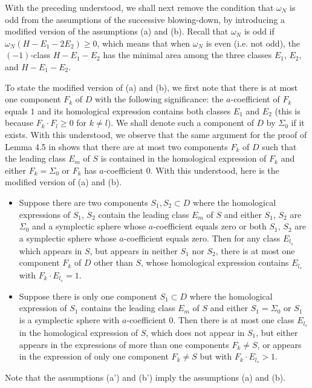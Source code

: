 \documentclass[11pt]{amsart}
\theoremstyle{plain}
\numberwithin{theorem}{section}
\theoremstyle{definition}
\begin{document}
With the preceding understood, we shall next remove the condition that $\omega_N$ is odd from
the assumptions of the successive blowing-down, by introducing a modified version of the assumptions (a) and (b). Recall that $\omega_N$ is odd if $\omega_N(H-E_1-2E_2)\geq 0$,
which means that when $\omega_N$ is even (i.e. not odd), the $(-1)$-class $H-E_1-E_2$
has the minimal area among the three classes $E_1$, $E_2$, and $H-E_1-E_2$. 

To state the modified version of (a) and (b), we first note that there is at most one component 
$F_k$ of $D$ with the following significance: the $a$-coefficient of $F_k$ equals $1$ and its homological expression contains both classes $E_1$ and $E_2$ (this is because $F_k\cdot F_l\geq 0$ for $k\neq l$). We shall denote such a component of $D$ by $\Sigma_0$ if it exists. With this understood, we observe that the same argument for the proof of Lemma 4.5 in \cite{C1} shows that there are at most two components $F_k$ of $D$ such that the leading class $E_m$ of $S$ is contained in the homological expression of $F_k$ and either $F_k=\Sigma_0$ or $F_k$ has 
$a$-coefficient $0$. With this understood, here is the modified version of (a) and (b).

\begin{itemize}
\item [{(a')}] Suppose there are two components $S_1,S_2\subset D$ where the homological expressions of $S_1$, $S_2$ contain the leading class $E_m$ of $S$ and either $S_1$, $S_2$ are 
$\Sigma_0$ and a symplectic sphere whose $a$-coefficient equals zero or both $S_1$, $S_2$ are 
a symplectic sphere whose $a$-coefficient equals zero. Then for any class $E_{l_s}$ which appears in $S$, but appears in neither $S_1$ nor $S_2$, there is at most one component $F_k$ of $D$ other than $S$, whose homological expression contains $E_{l_s}$ with $F_k\cdot E_{l_s}=1$.
\item [{(b')}] Suppose there is only one component $S_1\subset D$ where the homological expression of $S_1$ contains the leading class $E_m$ of $S$ and either $S_1=\Sigma_0$ or $S_1$ is a symplectic sphere with $a$-coefficient $0$. Then there is at most one class $E_{l_s}$ in the homological expression of $S$, which does not appear in $S_1$, but either appears in the expressions of more than one components $F_k\neq S$, or appears in the expression of only one component $F_k\neq S$ but with $F_k\cdot E_{l_s}>1$.
\end{itemize}

Note that the assumptions (a') and (b') imply the assumptions (a) and (b).
\end{document}

